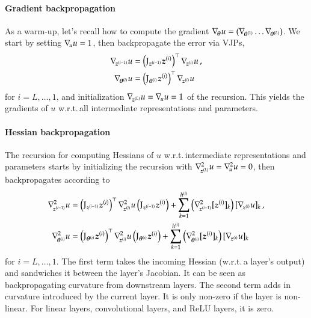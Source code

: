 \paragraph{Gradient backpropagation} As a warm-up, let's recall how to compute the gradient $\nabla_{\!{{\boldsymbol{\theta}}}}u =
(\nabla_{\!{{\boldsymbol{\theta}}^{(1)}}} \dots \nabla_{\!{{\boldsymbol{\theta}}^{(L)}}})$. We start by setting $\nabla_{\!{u}}
u = 1$, then backpropagate the error via VJPs,
\begin{align}\label{eq:gradient-backpropagation}
  \begin{split}
    \nabla_{\!{{\boldsymbol{z}}^{(i-1)}}}u
    &=
      \left( \mathrm{J}_{{\boldsymbol{z}}^{(i-1)}} {\boldsymbol{z}}^{(i)} \right)^{\top} \nabla_{\!{{\boldsymbol{z}}^{(i)}}}u\,,
    \\
    \nabla_{\!{{\boldsymbol{\theta}}^{(i)}}}u
    &=
      \left( \mathrm{J}_{{\boldsymbol{\theta}}^{(i)}} {\boldsymbol{z}}^{(i)} \right)^{\top} \nabla_{\!{{\boldsymbol{z}}^{(i)}}}u\,
  \end{split}
\end{align}
for $i = L, \dots, 1$, and initialization $\nabla_{\!{{\boldsymbol{z}}^{(L)}}}u = \nabla_{\!{u}}u = 1$ of the recursion.
This yields the gradients of $u$ w.r.t.\,all intermediate representations and parameters.

\paragraph{Hessian backpropagation} The recursion for computing Hessians of $u$
w.r.t.\,intermediate representations and parameters starts by initializing the
recursion with $\nabla_{\!{{\boldsymbol{z}}^{(L)}}}^{2}u = \nabla_{\!{u}}^{2} u = 0$, then
backpropagates according to
\begin{align}\label{eq:hessian-backpropagation}
  \begin{split}
    \gradsquared{\vz^{(i-1)}}u
    &=
      \left( \jac_{\vz^{(i-1)}} \vz^{(i)} \right)^{\top}
      \gradsquared{\vz^{(i)}}u
      \left( \jac_{\vz^{(i-1)}} \vz^{(i)} \right)
      +
      \sum_{k=1}^{h^{(i)}}
      \left(
      \gradsquared{\vz^{(i-1)}} [\vz^{(i)}]_k
      \right)
      [\grad{\vz^{(i)}} u]_k\,,
    \\
    \gradsquared{\vtheta^{(i)}}u
    &=
      \left( \jac_{\vtheta^{(i)}} \vz^{(i)} \right)^{\top}
      \gradsquared{\vz^{(i)}}u
      \left( \jac_{\vtheta^{(i)}} \vz^{(i)} \right)
      +
      \sum_{k=1}^{h^{(i)}}
      \left(
      \gradsquared{\vtheta^{(i)}} [\vz^{(i)}]_k
      \right)
      [\grad{\vz^{(i)}} u]_k
  \end{split}
\end{align}
for $i = L, \dots, 1$.
The first term takes the incoming Hessian (w.r.t.\,a layer's output) and sandwiches it between the layer's Jacobian.
It can be seen as backpropagating curvature from downstream layers.
The second term adds in curvature introduced by the current layer.
It is only non-zero if the layer is non-linear.
For linear layers, convolutional layers, and ReLU layers, it is zero.


